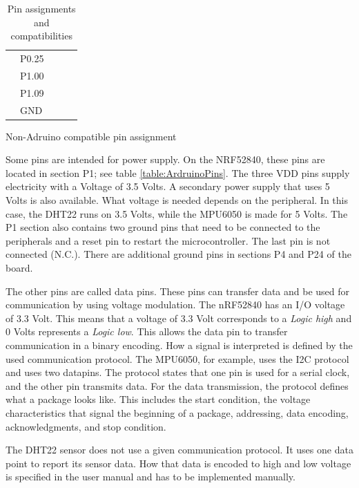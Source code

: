 \begin{table}[ht!]
\begin{subtable}[b]{.4\linewidth}
\begin{tabular}{l|l|l|l|l|}
			\multicolumn{1}{|l|}{} & P0.25  &               &             &             \\
			\multicolumn{1}{|l|}{} & P1.00  &               &             &             \\
			\multicolumn{1}{|l|}{} & P1.09  &               &             &             \\
			\multicolumn{1}{|l|}{} & GND    &               &             &             \\
			\hline
		\end{tabular}
		\caption{Non-Adruino compatible pin assignment}
		\label{table:otherPins}
	\end{subtable}
	\caption{Pin assignments and compatibilities}
\end{table}

Some pins are intended for power supply.
On the NRF52840, these pins are located in section P1; see table \ref{table:ArdruinoPins}.
The three VDD pins supply electricity with a Voltage of 3.5 Volts.
A secondary power supply that uses 5 Volts is also available.
What voltage is needed depends on the peripheral.
In this case, the DHT22 runs on 3.5 Volts, while the MPU6050 is made for 5 Volts.
The P1 section also contains two ground pins that need to be connected to the peripherals and a reset pin to restart the microcontroller.
The last pin is not connected (N.C.).
There are additional ground pins in sections P4 and P24 of the board.

The other pins are called data pins.
These pins can transfer data and be used for communication by using voltage modulation.
The nRF52840 has an I/O voltage of 3.3 Volt.
This means that a voltage of 3.3 Volt corresponds to a \textit{Logic high} and 0 Volts represents a \textit{Logic low}.
This allows the data pin to transfer communication in a binary encoding.
How a signal is interpreted is defined by the used communication protocol.
The MPU6050, for example, uses the I2C protocol and uses two datapins.
The protocol states that one pin is used for a serial clock, and the other pin transmits data.
For the data transmission, the protocol defines what a package looks like.
This includes the start condition, the voltage characteristics that signal the beginning of a package, addressing, data encoding, acknowledgments, and stop condition.

The DHT22 sensor does not use a given communication protocol.
It uses one data point to report its sensor data.
How that data is encoded to high and low voltage is specified in the user manual \cite{AM2302} and has to be implemented manually.

